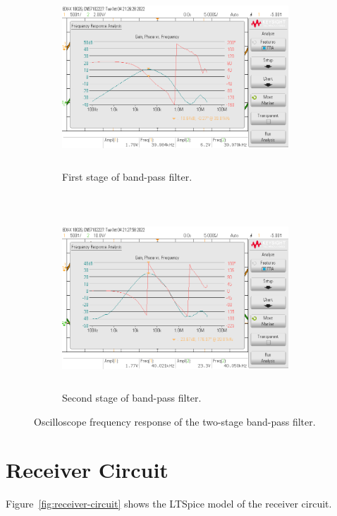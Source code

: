 \documentclass[class=report,11pt,crop=false]{standalone}
\begin{document}
\begin{figure}[htbp]
    \centering
    \captionsetup{type=figure}
    \begin{subfigure}[t]{0.5\textwidth}
        \centering
        \def\svgwidth{1\linewidth}
        {\scriptsize
            \includegraphics[width=8.5cm,height=6cm]{../Images/scope_4.png}}
        \caption{First stage of band-pass filter.}
        \label{fig:osc-transmitter-bpf-1}
    \end{subfigure}%
    ~ 
    \begin{subfigure}[t]{0.5\textwidth}
        \def\svgwidth{1\linewidth}
        {\scriptsize
            \includegraphics[width=8.5cm,height=6cm]{../Images/scope_6.png}}
        \caption{Second stage of band-pass filter.}
        \label{fig:osc-transmitter-bpf-2}
    \end{subfigure}
    \caption{Oscilloscope frequency response of the two-stage band-pass filter.}
    \label{fig:osc-transmitter-2}
\end{figure}

\section{Receiver Circuit}
Figure~\ref{fig:receiver-circuit} shows the LTSpice model of the receiver circuit.  
\end{document}
